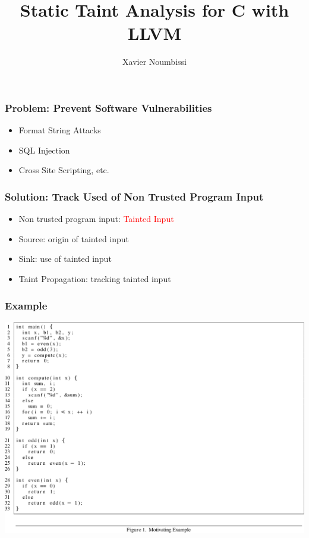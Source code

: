 \documentclass[xcolor=dvipsnames]{beamer}
\title[Static Taint Analysis for C with LLVM]
{Static Taint Analysis for C with LLVM}
\author[]{Xavier Noumbissi}
\institute[ECE 750 (Spring 2013)]{Department of Electrical and Computer Engineering\\ University of Waterloo}
\date{}
\begin{document}
\begin{frame}
  \titlepage
\end{frame}


\begin{frame}
  \frametitle{Problem: Prevent Software Vulnerabilities} {\Large	
	\begin{itemize}
	 \item Format String Attacks
	 \vspace{0.5cm}
	 \item SQL Injection
	 \vspace{0.5cm}
	 \item Cross Site Scripting, etc.
	\end{itemize}  
	}
\end{frame}

\begin{frame}
  \frametitle{Solution: Track Used of Non Trusted Program Input} {\Large
   \begin{itemize}
	\item Non trusted program input: \textcolor{red}{Tainted Input}
   	\vspace{0.5cm}	
	\item Source: origin of tainted input
   	\vspace{0.5cm}
	\item Sink: use of tainted input
   	\vspace{0.5cm}
	\item Taint Propagation: tracking tainted input
	\end{itemize}
	}
\end{frame}

\begin{frame}
  \frametitle{Example} 
    {\small
	\begin{center}
	\includegraphics[scale=0.55]{example}
	\end{center}   
	}
\end{frame}
\end{document}
